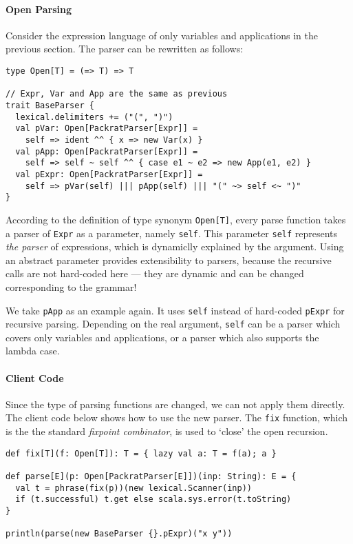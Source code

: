 \paragraph{Open Parsing} Consider the expression language of only variables and applications in the previous section. The parser can be rewritten as follows:

\begin{lstlisting}
type Open[T] = (=> T) => T

// Expr, Var and App are the same as previous
trait BaseParser {
  lexical.delimiters += ("(", ")")
  val pVar: Open[PackratParser[Expr]] =
    self => ident ^^ { x => new Var(x) }
  val pApp: Open[PackratParser[Expr]] =
    self => self ~ self ^^ { case e1 ~ e2 => new App(e1, e2) }
  val pExpr: Open[PackratParser[Expr]] =
    self => pVar(self) ||| pApp(self) ||| "(" ~> self <~ ")"
}
\end{lstlisting}

According to the definition of type synonym \lstinline{Open[T]}, every parse function takes a parser of \lstinline{Expr} as a parameter, namely \lstinline{self}. This parameter \lstinline{self} represents \emph{the parser} of expressions, which is dynamiclly explained by the argument. Using an abstract parameter provides extensibility to parsers, because the recursive calls are not hard-coded here --- they are dynamic and can be changed corresponding to the grammar!

We take \lstinline{pApp} as an example again. It uses \lstinline{self} instead of hard-coded \lstinline{pExpr} for recursive parsing. Depending on the real argument, \lstinline{self} can be a parser which covers only variables and applications, or a parser which also supports the lambda case.

\paragraph{Client Code} Since the type of parsing functions are changed, we can not apply them directly. The client code below shows how to use the new parser. The \lstinline{fix} function, which is the the standard \textit{fixpoint combinator}, is used to `close' the open recursion.

\begin{lstlisting}
def fix[T](f: Open[T]): T = { lazy val a: T = f(a); a }

def parse[E](p: Open[PackratParser[E]])(inp: String): E = {
  val t = phrase(fix(p))(new lexical.Scanner(inp))
  if (t.successful) t.get else scala.sys.error(t.toString)
}

println(parse(new BaseParser {}.pExpr)("x y"))
\end{lstlisting}

